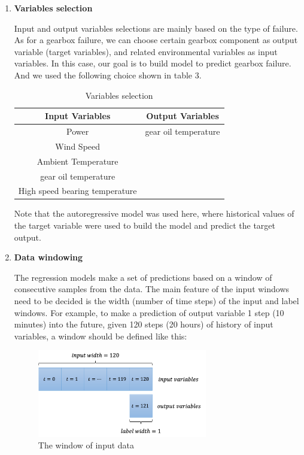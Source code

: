 \begin{enumerate}
\item \textbf{Variables selection}

Input and output variables selections are mainly based on the type of failure. As for a gearbox failure, we can choose certain gearbox component as output variable (target variables)\cite{kusiak2011prediction}, and related environmental variables as input variables. In this case, our goal is to build model to predict gearbox failure. And we used the following choice shown in table 3.  

\begin{table}[]
\centering
\begin{tabular}{|c|c|}
\hline
\textbf{Input Variables} & \textbf{Output Variables} \\ \hline
Power                    & gear oil temperature      \\ \hline
Wind Speed               &                           \\ \hline
Ambient Temperature      &                           \\ \hline
gear oil temperature     &                           \\ \hline
High speed bearing temperature  &                    \\ \hline
\end{tabular}
\caption{Variables selection}
\end{table}

Note that the autoregressive model was used here, where historical values of the target variable were used to build the model and predict the target output\cite{tautz2016using}.

\item \textbf{Data windowing}

The regression models make a set of predictions based on a window of consecutive samples from the data. The main feature of the input windows need to be decided is the width (number of time steps) of the input and label windows. For example, to make a prediction of output variable 1 step (10 minutes) into the future, given 120 steps (20 hours) of history of input variables, a window should be defined like this:

\begin{figure}[]
\centering
\includegraphics[width=0.7\textwidth]{figures/datawindow.png}
\caption{The window of input data}
\label{fig:B-B1}
\end{figure}


\end{enumerate}
